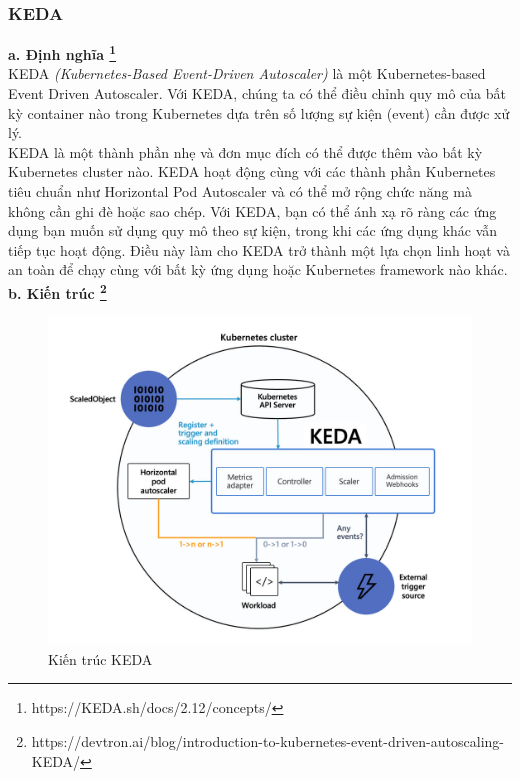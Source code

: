 \subsubsection{KEDA}
\textbf{a. Định nghĩa \footnote{https://KEDA.sh/docs/2.12/concepts/}}\\[0.5cm]
KEDA \textit{(Kubernetes-Based Event-Driven Autoscaler)} là một Kubernetes-based Event Driven Autoscaler. Với KEDA, chúng ta có thể điều chỉnh quy mô của bất kỳ container nào trong Kubernetes dựa trên số lượng sự kiện (event) cần được xử lý.\\[0.5cm]
KEDA là một thành phần nhẹ và đơn mục đích có thể được thêm vào bất kỳ Kubernetes cluster nào. KEDA hoạt động cùng với các thành phần Kubernetes tiêu chuẩn như Horizontal Pod Autoscaler và có thể mở rộng chức năng mà không cần ghi đè hoặc sao chép. Với KEDA, bạn có thể ánh xạ rõ ràng các ứng dụng bạn muốn sử dụng quy mô theo sự kiện, trong khi các ứng dụng khác vẫn tiếp tục hoạt động. Điều này làm cho KEDA trở thành một lựa chọn linh hoạt và an toàn để chạy cùng với bất kỳ ứng dụng hoặc Kubernetes framework nào khác.\\[0.5cm]
\textbf{b. Kiến trúc \footnote{https://devtron.ai/blog/introduction-to-kubernetes-event-driven-autoscaling-KEDA/}}
 
\begin{figure}[H]
  \begin{center}
    \includegraphics[scale=0.32]{images/phat/KEDA Architecture.jpg}
    \caption{Kiến trúc KEDA}
  \end{center}
\end{figure}

